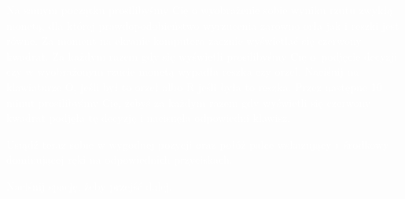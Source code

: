 \documentclass[12pt, crop,varwidth,border=3pt,convert={density=300,outext=.png}]{standalone}
\begin{document}
\textcolor{white}{Na samym początku prosilibyśmy Cię o wyobrażenie sobie wyniku rzutu zwykłą monetą, dla której prawdopodobieństwo wyrzucenia zarówno orła jak i reszki jest równe. Za moment na ekranie komputera zacznie wyświetlać się czerwony kwadrat. Za każdym razem gdy się wyświetli prosilibyśmy Cię o~podjęcie decyzji czy w wyobrażonym rzucie monetą wypadła reszka czy orzeł. Naciśnij na klawiaturze O, jeśli był to orzeł albo R jeśli była to reszka. Przez następne 10 minut prosilibyśmy Cię, żebyś za każdym razem gdy wyświetli się czerwony kwadrat podjęła tę decyzję i nacisnęła odpowiedni klawisz.}
\newline

\textcolor{white}{Usiądź teraz sobie w wygodnej pozycji oraz połóż palce wskazujący i~środkowy dominującej ręki na odpowiednich przyciskach.}

\begin{center}
\textcolor{white}{\Large Naciśnij spację, żeby przejść dalej.}
\end{center}
\end{document}
